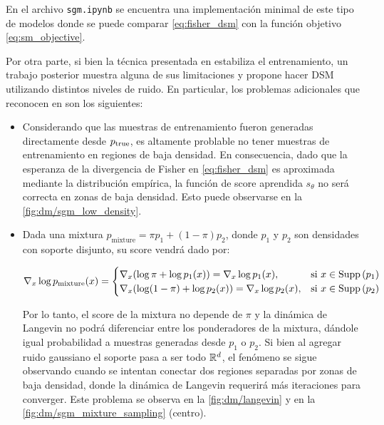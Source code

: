 En el archivo \texttt{sgm.ipynb} se encuentra una implementación minimal de este tipo de modelos donde se puede comparar \eqref{eq:fisher_dsm} con la función objetivo \eqref{eq:sm_objective}.

Por otra parte, si bien la técnica presentada en \cite{DSM} estabiliza el entrenamiento, un trabajo posterior muestra alguna de sus limitaciones y propone hacer DSM utilizando distintos niveles de ruido. En particular, los problemas adicionales que reconocen en \cite{song2020generative} son los siguientes:

\begin{itemize}
    \item Considerando que las muestras de entrenamiento fueron generadas directamente desde $p_{\operatorname{true}}$, es altamente problable no tener muestras de entrenamiento en regiones de baja densidad. En consecuencia, dado que la esperanza de la divergencia de Fisher en \eqref{eq:fisher_dsm} es aproximada mediante la distribución empírica, la función de score aprendida $s_\theta$ no será correcta en zonas de baja densidad. Esto puede observarse en la \autoref{fig:dm/sgm_low_density}.


    \item Dada una mixtura $p_{\text{mixture}} = \pi p_1 + (1-\pi) p_2$, donde $p_1$ y $p_2$ son densidades con soporte disjunto, su score vendrá dado por:

          \begin{equation*}
              \nabla_{x} \log p_{\text{mixture}}(x) = \begin{cases}
                  \nabla_x (\log \pi + \log p_1(x)) = \nabla_x\log p_1(x),     &\text{si } x\in\operatorname{Supp}\left(p_1\right) \\
                  \nabla_x (\log (1-\pi) + \log p_2(x)) = \nabla_x\log p_2(x), &\text{si } x\in\operatorname{Supp}\left(p_2\right)
              \end{cases}
          \end{equation*}

          Por lo tanto, el score de la mixtura no depende de $\pi$ y la dinámica de Langevin no podrá diferenciar entre los ponderadores de la mixtura, dándole igual probabilidad a muestras generadas desde $p_1$ o $p_2$. Si bien al agregar ruido gaussiano el soporte pasa a ser todo $\mathbb{R}^d$, el fenómeno se sigue observando cuando se intentan conectar dos regiones separadas por zonas de baja densidad, donde la dinámica de Langevin requerirá más iteraciones para converger. Este problema se observa en la \autoref{fig:dm/langevin} y en la \autoref{fig:dm/sgm_mixture_sampling} (centro).
\end{itemize}


